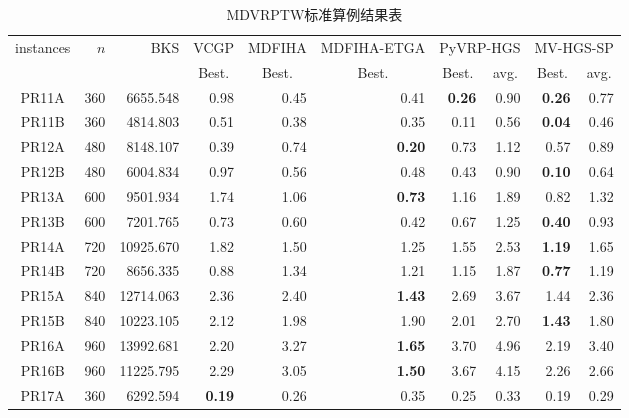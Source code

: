 \documentclass{setp-new}
\newcommand{\setptabsetup}{\fontsize{9pt}{10.5pt}\selectfont\renewcommand{\arraystretch}{0.95}\setlength{\tabcolsep}{2.2pt}\setlength{\aboverulesep}{0.4pt}\setlength{\belowrulesep}{0.4pt}\hbadness=10000}
\begin{document}
\begin{table}[H]
\centering
\caption{MDVRPTW标准算例结果表}
\label{tab:v13-results}
\setptabsetup
\begin{tabular*}{\linewidth}{@{\extracolsep{\fill}}crrrrr@{\hspace{8pt}}rr@{\hspace{8pt}}rr@{}}
\toprule
\multirow{2}{*}{instances} & \multirow{2}{*}{$n$} & \multirow{2}{*}{BKS} & \multicolumn{1}{c}{VCGP} & \multicolumn{1}{c}{MDFIHA} & \multicolumn{1}{c}{MDFIHA-ETGA} & \multicolumn{2}{c}{PyVRP-HGS} & \multicolumn{2}{c}{MV-HGS-SP}\\
\cmidrule(lr){4-4}\cmidrule(lr){5-5}\cmidrule(lr){6-6}\cmidrule(lr){7-8}\cmidrule(lr){9-10}
 &  &  & \multicolumn{1}{c}{Best.} & \multicolumn{1}{c}{Best.} & \multicolumn{1}{c}{Best.} & \multicolumn{1}{c}{Best.} & \multicolumn{1}{c}{avg.} & \multicolumn{1}{c}{Best.} & \multicolumn{1}{c}{avg.}\\
\midrule
PR11A & 360 & 6655.548 & 0.98 & 0.45 & 0.41 & \textbf{0.26} & 0.90 & \textbf{0.26} & 0.77 \\
PR11B & 360 & 4814.803 & 0.51 & 0.38 & 0.35 & 0.11 & 0.56 & \textbf{0.04} & 0.46 \\
PR12A & 480 & 8148.107 & 0.39 & 0.74 & \textbf{0.20} & 0.73 & 1.12 & 0.57 & 0.89 \\
PR12B & 480 & 6004.834 & 0.97 & 0.56 & 0.48 & 0.43 & 0.90 & \textbf{0.10} & 0.64 \\
PR13A & 600 & 9501.934 & 1.74 & 1.06 & \textbf{0.73} & 1.16 & 1.89 & 0.82 & 1.32 \\
PR13B & 600 & 7201.765 & 0.73 & 0.60 & 0.42 & 0.67 & 1.25 & \textbf{0.40} & 0.93 \\
PR14A & 720 & 10925.670 & 1.82 & 1.50 & 1.25 & 1.55 & 2.53 & \textbf{1.19} & 1.65 \\
PR14B & 720 & 8656.335 & 0.88 & 1.34 & 1.21 & 1.15 & 1.87 & \textbf{0.77} & 1.19 \\
PR15A & 840 & 12714.063 & 2.36 & 2.40 & \textbf{1.43} & 2.69 & 3.67 & 1.44 & 2.36 \\
PR15B & 840 & 10223.105 & 2.12 & 1.98 & 1.90 & 2.01 & 2.70 & \textbf{1.43} & 1.80 \\
PR16A & 960 & 13992.681 & 2.20 & 3.27 & \textbf{1.65} & 3.70 & 4.96 & 2.19 & 3.40 \\
PR16B & 960 & 11225.795 & 2.29 & 3.05 & \textbf{1.50} & 3.67 & 4.15 & 2.26 & 2.66 \\
PR17A & 360 & 6292.594 & \textbf{0.19} & 0.26 & 0.35 & 0.25 & 0.33 & 0.19 & 0.29 \\

\end{tabular*}
\end{table}
\end{document}
